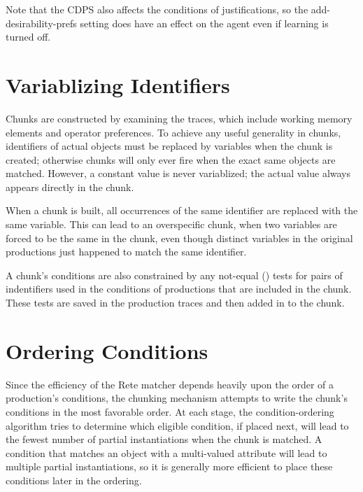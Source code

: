 Note that the CDPS also affects the conditions of justifications, so the
add-desirability-prefs setting does have an effect on the agent even if learning
is turned off.

\section{Variablizing Identifiers}
\label{CHUNKING-variablizing}

Chunks are constructed by examining the traces, which include working memory
elements and operator preferences. To achieve any useful generality in chunks,
identifiers of actual objects must be replaced by variables when the chunk is
created; otherwise chunks will only ever fire when the exact same objects
are matched.  However, a constant value is never variablized; the actual 
value always appears directly in the chunk.

When a chunk is built, all occurrences of the same identifier are replaced
with the same variable. This can lead to an overspecific chunk, when two
variables are forced to be the same in the chunk, even though distinct
variables in the original productions just happened to match the same
identifier.

A chunk's conditions are also constrained by any not-equal (\soar{<>}) tests
for pairs of indentifiers used in the conditions of productions that are
included in the chunk. These tests are saved in the production traces and then
added in to the chunk.

\section{Ordering Conditions}
\label{CHUNKING-ordering}


Since the efficiency of the Rete matcher  \cite{Forg81} depends
heavily upon the order of a production's conditions, the chunking mechanism
attempts to write the chunk's conditions in the most favorable order. At each
stage, the condition-ordering algorithm tries to determine which eligible
condition, if placed next, will lead to the fewest number of partial
instantiations when the chunk is matched. A condition that matches an object
with a multi-valued attribute will lead to multiple partial instantiations, so
it is generally more efficient to place these conditions later in the
ordering.

